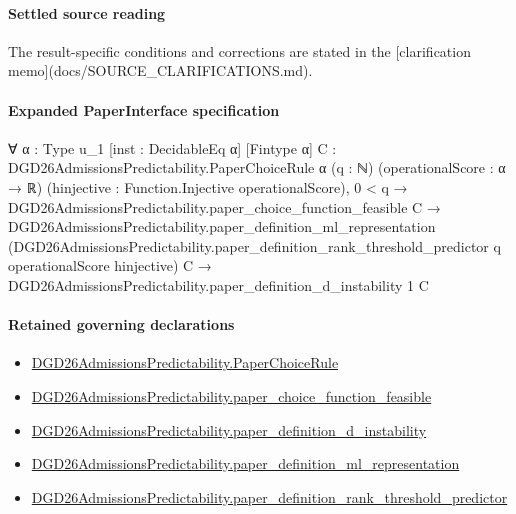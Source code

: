 \documentclass[10pt]{article}
\begin{document}
\paragraph{Settled source reading}
The result-\allowbreak{}specific conditions and corrections are stated in the [clarification memo](docs/\allowbreak{}SOURCE\_\allowbreak{}CLARIFICATIONS.\allowbreak{}md).\allowbreak{}

\paragraph{Expanded PaperInterface specification}
\begin{ReviewVerbatim}
∀ {α : Type u_1} [inst : DecidableEq α] [Fintype α] {C : DGD26AdmissionsPredictability.PaperChoiceRule α} (q : ℕ)
  (operationalScore : α → ℝ) (hinjective : Function.Injective operationalScore),
  0 < q →
    DGD26AdmissionsPredictability.paper_choice_function_feasible C →
      DGD26AdmissionsPredictability.paper_definition_ml_representation
          (DGD26AdmissionsPredictability.paper_definition_rank_threshold_predictor q operationalScore hinjective) C →
        DGD26AdmissionsPredictability.paper_definition_d_instability 1 C
\end{ReviewVerbatim}

\paragraph{Retained governing declarations}
\begin{itemize}\raggedright
\item \hyperlink{governing-declaration-4678951b4432b184}{DGD26\allowbreak{}Admissions\allowbreak{}Predictability.\allowbreak{}Paper\allowbreak{}Choice\allowbreak{}Rule}
\item \hyperlink{governing-declaration-f7de74a44053f6d5}{DGD26\allowbreak{}Admissions\allowbreak{}Predictability.\allowbreak{}paper\_\allowbreak{}choice\_\allowbreak{}function\_\allowbreak{}feasible}
\item \hyperlink{governing-declaration-ce2c1c7a5233a84a}{DGD26\allowbreak{}Admissions\allowbreak{}Predictability.\allowbreak{}paper\_\allowbreak{}definition\_\allowbreak{}d\_\allowbreak{}instability}
\item \hyperlink{governing-declaration-6f1fddfd896a577f}{DGD26\allowbreak{}Admissions\allowbreak{}Predictability.\allowbreak{}paper\_\allowbreak{}definition\_\allowbreak{}ml\_\allowbreak{}representation}
\item \hyperlink{governing-declaration-302cb3b60c7e48b6}{DGD26\allowbreak{}Admissions\allowbreak{}Predictability.\allowbreak{}paper\_\allowbreak{}definition\_\allowbreak{}rank\_\allowbreak{}threshold\_\allowbreak{}predictor}
\end{itemize}
\end{document}
